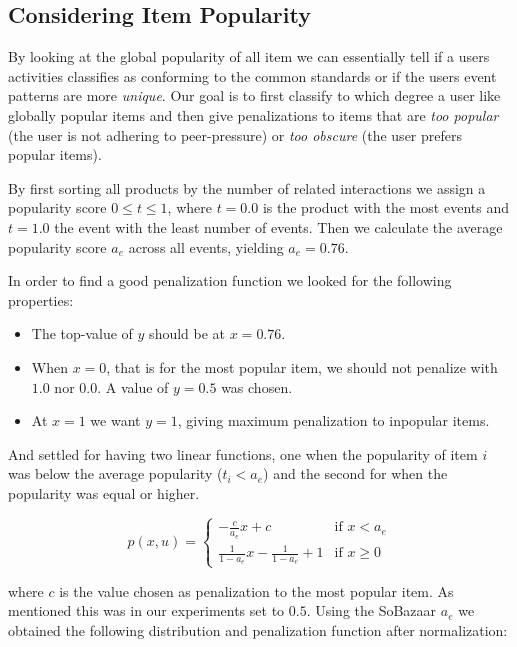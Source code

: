 \subsection{Considering Item Popularity}

By looking at the global popularity of all item we can essentially tell if a
users activities classifies as conforming to the common standards or if the
users event patterns are more \textit{unique}. Our goal is to first classify to
which degree a user like globally popular items and then give penalizations to
items that are \textit{too popular} (the user is not adhering to peer-pressure)
or \textit{too obscure} (the user prefers popular items).

By first sorting all products by the number of related interactions we assign
a popularity score $0 \leq t \leq 1$, where $t=0.0$ is the product with the most
events and $t=1.0$ the event with the least number of events. Then we calculate
the average popularity score $a_e$ across all events, yielding $a_e = 0.76$.

In order to find a good penalization function we looked for the following
properties:

\begin{itemize}
  \item The top-value of $y$ should be at $x = 0.76$.
  \item When $x = 0$, that is for the most popular item, we should not penalize
  with $1.0$ nor $0.0$. A value of $y = 0.5$ was chosen.
  \item At $x = 1$ we want $y = 1$, giving maximum penalization to
  inpopular items.
\end{itemize}

And settled for having two linear functions, one when the popularity of item
$i$ was below the average popularity ($t_i < a_e$) and the second for when the
popularity was equal or higher.

\begin{equation}
  p(x, u) =
    \begin{cases}
      -\frac{c}{a_e}x + c                     & \text{if } x < a_e \\[1.5ex]
      \frac{1}{1-a_e}x - \frac{1}{1-a_e} + 1  & \text{if } x \geq 0
    \end{cases}
\end{equation}

where $c$ is the value chosen as penalization to the most popular item. As
mentioned this was in our experiments set to $0.5$. Using the SoBazaar $a_e$ we
obtained the following distribution and penalization function after
normalization:

